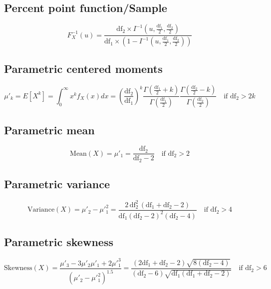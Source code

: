 \documentclass{article}
\begin{document}
\subsection{Percent point function/Sample}
\begin{equation*} F^{-1}_{X}\left(u\right)=\frac{\text{df}_{2}\times I^{-1}\left(u,\frac{\text{df}_{1}}{2},\frac{\text{df}_{2}}{2}\right)}{\text{df}_{1}\times \left(1-I^{-1}\left(u,\frac{\text{df}_{1}}{2},\frac{\text{df}_{2}}{2}\right)\right)} \end{equation*}
\subsection{Parametric centered moments}
\begin{equation*} \mu'_{k}=E[X^k]=\int_{0}^{\infty}x^{k }f_{X}\left(x\right)dx=\left(\frac{\text{df}_{2}}{\text{df}_{1}}\right)^k\frac{\Gamma\left(\tfrac{\text{df}_{1}}{2}+k\right) }{\Gamma\left(\tfrac{\text{df}_{1}}{2}\right)}\frac{\Gamma\left(\tfrac{\text{df}_{2}}{2}-k\right) }{\Gamma\left(\tfrac{\text{df}_{2}}{2}\right) } \quad \text{if }\text{df}_{2} > 2k \end{equation*}
\subsection{Parametric mean}
\begin{equation*} \mathrm{Mean}(X)=\mu'_{1}=\frac{\text{df}_{2}}{\text{df}_{2}-2} \quad \text{if }\text{df}_{2} > 2 \end{equation*}
\subsection{Parametric variance}
\begin{equation*} \mathrm{Variance}(X)=\mu'_{2}-\mu'^{2}_{1}=\frac{2\,\text{df}_{2}^2\,(\text{df}_{1}+\text{df}_{2}-2)}{\text{df}_{1} (\text{df}_{2}-2)^2 (\text{df}_{2}-4)} \quad \text{if }\text{df}_{2} > 4 \end{equation*}
\subsection{Parametric skewness}
\begin{equation*} \mathrm{Skewness}(X)=\frac{\mu'_{3}-3\mu'_{2}\mu'_{1}+2\mu'^{3}_{1}}{(\mu'_{2}-\mu'^{2}_{1})^{1.5}}=\frac{(2 \text{df}_{1}+\text{df}_{2}-2) \sqrt{8 (\text{df}_{2}-4)}}{(\text{df}_{2}-6) \sqrt{\text{df}_{1} (\text{df}_{1}+\text{df}_{2} -2)}}\quad \text{if }\text{df}_{2} > 6 \end{equation*}
\end{document}
